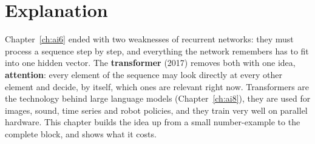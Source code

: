 \label{ch:ai7}

\section*{Explanation}
Chapter~\ref{ch:ai6} ended with two weaknesses of recurrent networks: they must process a sequence step by step, and everything the network remembers has to fit into one hidden vector. The \textbf{transformer} (2017) removes both with one idea, \textbf{attention}: every element of the sequence may look directly at every other element and decide, by itself, which ones are relevant right now. Transformers are the technology behind large language models (Chapter~\ref{ch:ai8}), they are used for images, sound, time series and robot policies, and they train very well on parallel hardware. This chapter builds the idea up from a small number-example to the complete block, and shows what it costs.

